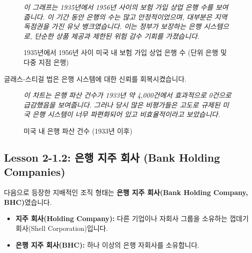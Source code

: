 \documentclass[11pt,a4paper]{article}
\theoremstyle{definition}
\begin{document}
\begin{figure}[h!]
    \centering
    \caption{1935년에서 1956년 사이 미국 내 보험 가입 상업 은행 수 (단위 은행 및 다중 지점 은행)}
    \label{fig:banks_1935_1956}
    \textit{이 그래프는 1935년에서 1956년 사이의 보험 가입 상업 은행 수를 보여줍니다. 이 기간 동안 은행의 수는 많고 안정적이었으며, 대부분은 지역 독점권을 가진 유닛 뱅크였습니다. 이는 정부가 보장하는 은행 시스템으로, 단순한 상품 제공과 제한된 위험 감수 기회를 가졌습니다.}
\end{figure}

글래스-스티걸 법은 은행 시스템에 대한 신뢰를 회복시켰습니다.

\begin{figure}[h!]
    \centering
    \caption{미국 내 은행 파산 건수 (1933년 이후)}
    \label{fig:bank_failures}
    \textit{이 차트는 은행 파산 건수가 1933년 약 4,000건에서 효과적으로 0건으로 급감했음을 보여줍니다. 그러나 당시 많은 비평가들은 고도로 규제된 미국 은행 시스템이 너무 파편화되어 있고 비효율적이라고 보았습니다.}
\end{figure}

\newpage
\subsection{Lesson 2-1.2: 은행 지주 회사 (Bank Holding Companies)}

다음으로 등장한 지배적인 조직 형태는 \textbf{은행 지주 회사(Bank Holding Company, BHC)}였습니다.

\begin{itemize}
    \item \textbf{지주 회사(Holding Company):} 다른 기업이나 자회사 그룹을 소유하는 껍데기 회사(Shell Corporation)입니다.
    \item \textbf{은행 지주 회사(BHC):} 하나 이상의 은행 자회사를 소유합니다.
\end{itemize}
\end{document}
